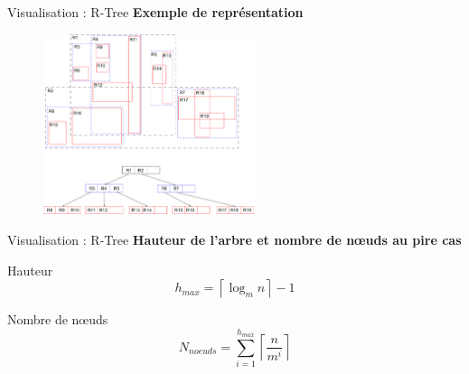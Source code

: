\documentclass[frames,pdf,slideColor,colorBG,accumulate,total]{prosper}
\begin{document}
  \begin{slide}[Box]{Visualisation : R-Tree}
        \textbf{Exemple de représentation}
      \begin{figure}[t]

        \begin{center}
          \includegraphics[width=0.55\textwidth]{img/rtree}
        \end{center}
      \end{figure}
  \end{slide}

  \begin{slide}[Box]{Visualisation : R-Tree}
    \textbf{Hauteur de l'arbre et nombre de nœuds au pire cas}
    \begin{Itemize}
    \item Hauteur
      \begin{equation*}
        h_{max} = \left\lceil\log_{m} n\right\rceil - 1
      \end{equation*}
      
    \item Nombre de nœuds
      \begin{equation*}
        N_{noeuds}=\sum_{i=1}^{h_{max}}{\left\lceil\frac{n}{m^i}\right\rceil}
      \end{equation*}
    \end{Itemize}
  \end{slide}
\end{document}
